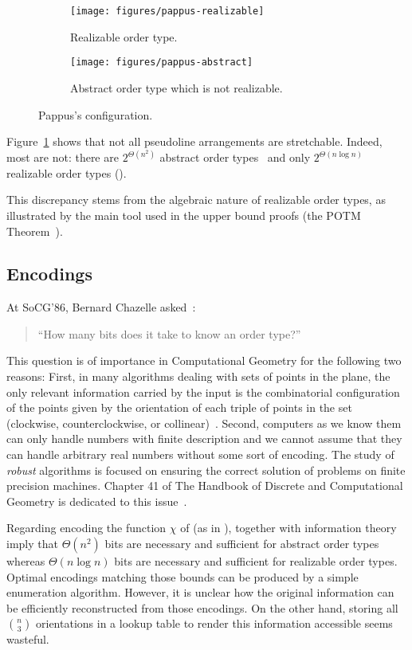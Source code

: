 \begin{figure}
	\centering{}
    \begin{subfigure}[t]{0.5\textwidth}
		\centering{}
		\texttt{[image: figures/pappus-realizable]}
		\caption{Realizable order type.}
    \end{subfigure}%
    \begin{subfigure}[t]{0.5\textwidth}
		\centering{}
		\texttt{[image: figures/pappus-abstract]}
		\caption{Abstract order type which is not realizable.}
    \end{subfigure}
	\caption{Pappus's configuration.}\label{fig:pappus}
\end{figure}

Figure~\ref{fig:pappus} shows that not all pseudoline arrangements are
stretchable. Indeed, most are not: there are \(2^{\Theta(n^2)}\)
abstract order types~\cite{Fe96} and only \(2^{\Theta(n \log n)}\) realizable
order types ().
%

%
This discrepancy stems from the algebraic nature of realizable order types, as
illustrated by the main tool used in the upper bound proofs (the
POTM Theorem~\cite{Mi64,Th65,BPR06}).

\subsection{Encodings}%
\label{sec:problem:pol:encodings}

At SoCG'86, Bernard Chazelle asked~\cite{GP93}:
\begin{quotation}
``How many bits does it take to know an order type?''
\end{quotation}

This question is of importance in Computational Geometry for the following two
reasons:
%
First, in many algorithms dealing with sets of points in the plane,
the only relevant information carried by the input is the combinatorial
configuration of the points given by the orientation of each triple of points in the
set (clockwise, counterclockwise, or collinear)~\cite{Knu92,Ed12,Epp18}.
%
Second, computers as we know them can only handle numbers with
finite description and we cannot assume that they can handle arbitrary
real numbers without some sort of encoding. The study of \emph{robust}
algorithms is focused on ensuring the correct solution of problems on finite
precision machines. Chapter 41 of The Handbook of Discrete and Computational
Geometry is dedicated to this issue~\cite{Ya04}.


Regarding encoding the function \(\chi\) of 
(as in ),
 together with information theory
imply that \(\Theta(n^2)\) bits are necessary
and sufficient for abstract order types whereas \(\Theta(n \log n)\) bits are
necessary and sufficient for realizable order types.
Optimal encodings matching those bounds can be produced
by a simple enumeration algorithm.
%
However, it is unclear how the original information can be
efficiently reconstructed from those encodings.
%
On the other hand, storing all \( \binom{n}{3} \) orientations in a lookup
table to render this information accessible seems wasteful.

